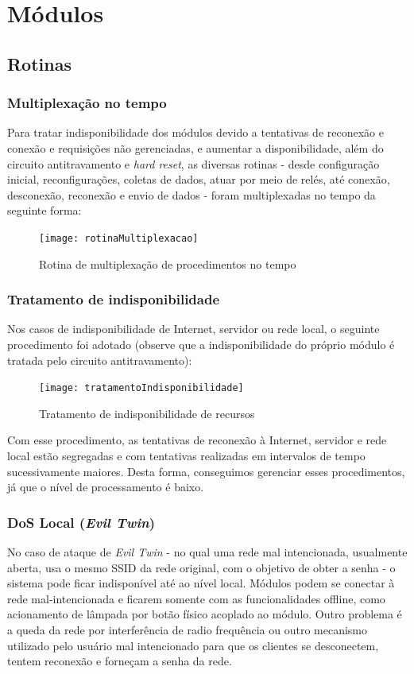 \section{Módulos}
\subsection {Rotinas}
\subsubsection{Multiplexação no tempo}
Para tratar indisponibilidade dos módulos devido a tentativas de reconexão e conexão e requisições não gerenciadas, e aumentar a disponibilidade, além do circuito antitravamento e \textit{hard reset}, as diversas rotinas - desde configuração inicial, reconfigurações, coletas de dados, atuar por meio de relés, até conexão, desconexão, reconexão e envio de dados - foram multiplexadas no tempo da seguinte forma:

\begin{figure} [H]
	\centering
	\caption{Rotina de multiplexação de procedimentos no tempo}
  \texttt{[image: rotinaMultiplexacao]}
\label{fig:rotinaMultiplexacao}
\end{figure}

\subsubsection{Tratamento de indisponibilidade}
Nos casos de indisponibilidade de Internet, servidor ou rede local, o seguinte procedimento foi adotado (observe que a indisponibilidade do próprio módulo é tratada pelo circuito antitravamento):

\begin{figure}[H]
	\centering
	\caption{Tratamento de indisponibilidade de recursos}
  \texttt{[image: tratamentoIndisponibilidade]}
\label{fig:tratamentoIndisponibilidade}
\end{figure}

Com esse procedimento, as tentativas de reconexão à Internet, servidor e rede local estão segregadas e com tentativas realizadas em intervalos de tempo sucessivamente maiores. Desta forma, conseguimos gerenciar esses procedimentos, já que o nível de processamento é baixo.

\subsubsection{DoS Local (\textit{Evil Twin})}
No caso de ataque de \textit{Evil Twin} - no qual uma rede mal intencionada, usualmente aberta, usa o mesmo SSID da rede original, com o objetivo de obter a senha - o sistema pode ficar indisponível até ao nível local. Módulos podem se conectar à rede mal-intencionada e ficarem somente com as funcionalidades offline, como acionamento de lâmpada por botão físico acoplado ao módulo. Outro problema é a queda da rede por interferência de radio frequência ou outro mecanismo utilizado pelo usuário mal intencionado para que os clientes se desconectem, tentem reconexão e forneçam a senha da rede.

